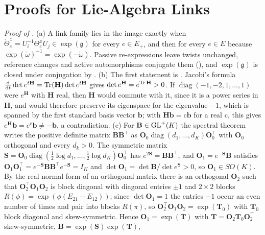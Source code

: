 \section{Proofs for Lie-Algebra Links}
\label{sec:proofs-links}

\noindent\emph{Proof of .}
(a) A link family lies in the image exactly when
$\mathring\Theta^x_e=U_i^{-1}\Theta^x_eU_j\in\exp(\mathfrak g)$ for every $e\in E_+$, and then for every
$e\in E$ because $\exp(\mathring\omega)^{-1}=\exp(-\mathring\omega)$. Passive re-expressions leave
twists unchanged, reference changes and active automorphisms conjugate them
(), and $\exp(\mathfrak g)$ is closed under conjugation by
.
(b) The first statement is . Jacobi's formula
$\frac{\mathrm d}{\mathrm dt}\det e^{t\mathbf H}=\operatorname{Tr}(\mathbf H)\det e^{t\mathbf H}$ gives
$\det e^{\mathbf H}=e^{\operatorname{Tr}\mathbf H}>0$. If $\operatorname{diag}(-1,-2,1,\ldots,1)$ were $e^{\mathbf H}$
with $\mathbf H$ real, then $\mathbf H$ would commute with it, since it is a power series in
$\mathbf H$, and would therefore preserve its eigenspace for the eigenvalue $-1$, which is spanned by
the first standard basis vector $\mathbf b$; with $\mathbf H\mathbf b=\mathrm c\mathbf b$ for a real $\mathrm c$, this
gives $e^{\mathbf H}\mathbf b=e^{\mathrm c}\mathbf b\neq-\mathbf b$, a contradiction.
(c) For $\mathbf B\in\mathrm{GL}^+(K)$ the spectral theorem writes the positive definite matrix
$\mathbf B\mathbf B^\top$ as $\mathbf O_0\operatorname{diag}(d_1,\ldots,d_K)\mathbf O_0^\top$ with
$\mathbf O_0$ orthogonal and every $d_k>0$. The symmetric matrix
$\mathbf S=\mathbf O_0\operatorname{diag}(\frac12\log d_1,\ldots,\frac12\log d_K)\mathbf O_0^\top$ has
$e^{2\mathbf S}=\mathbf B\mathbf B^\top$, and $\mathbf O_1=e^{-\mathbf S}\mathbf B$ satisfies
$\mathbf O_1\mathbf O_1^\top=e^{-\mathbf S}\mathbf B\mathbf B^\top e^{-\mathbf S}=I_K$ and
$\det\mathbf O_1=\det\mathbf B/\det e^{\mathbf S}>0$, so $\mathbf O_1\in SO(K)$. By the real normal
form of an orthogonal matrix there is an orthogonal $\mathbf O_2$ such that
$\mathbf O_2^\top\mathbf O_1\mathbf O_2$ is block diagonal with diagonal entries $\pm1$ and $2\times2$
blocks $R(\phi)=\exp(\phi(E_{21}-E_{12}))$; since $\det\mathbf O_1=1$ the entries $-1$ occur an even
number of times and pair into blocks $R(\pi)$, so $\mathbf O_2^\top\mathbf O_1\mathbf O_2=\exp(\mathbf T_0)$
with $\mathbf T_0$ block diagonal and skew-symmetric. Hence $\mathbf O_1=\exp(\mathbf T)$ with
$\mathbf T=\mathbf O_2\mathbf T_0\mathbf O_2^\top$ skew-symmetric, $\mathbf B=\exp(\mathbf S)\exp(\mathbf T)$,

